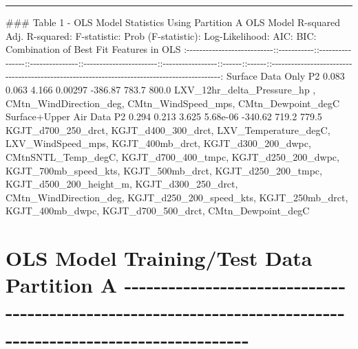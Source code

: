 \documentclass[11pt]{article}
\begin{document}
\begin{center}\rule{0.5\linewidth}{\linethickness}\end{center}

\#\#\# Table 1 - OLS Model Statistics Using Partition A \textbar{}OLS
Model \textbar{} R-squared \textbar{} Adj. R-squared: \textbar{}
F-statistic: \textbar{} Prob (F-statistic): \textbar{} Log-Likelihood:
\textbar{} AIC: \textbar{} BIC: \textbar{} Combination of Best Fit
Features in OLS \textbar{}
\textbar{}:-\/-\/-\/-\/-\/-\/-\/-\/-\/-\/-\/-\/-\/-\/-\/-\/-\/-\/-\/-\/-\/-\/-\/-\/-\/-\/-:\textbar{}:-\/-\/-\/-\/-\/-\/-\/-\/-\/-\/-:\textbar{}:-\/-\/-\/-\/-\/-\/-\/-\/-\/-\/-\/-\/-\/-\/-\/-:\textbar{}:-\/-\/-\/-\/-\/-\/-\/-\/-\/-\/-\/-\/-\/-\/-:\textbar{}:-\/-\/-\/-\/-\/-\/-\/-\/-\/-\/-\/-\/-\/-\/-\/-\/-\/-\/-\/-\/-\/-\/-:\textbar{}:-\/-\/-\/-\/-\/-\/-\/-\/-\/-\/-\/-\/-\/-\/-\/-\/-:\textbar{}:-\/-\/-\/-\/-\/-:\textbar{}:-\/-\/-\/-\/-\/-:\textbar{}:-\/-\/-\/-\/-\/-\/-\/-\/-\/-\/-\/-\/-\/-\/-\/-\/-\/-\/-\/-\/-\/-\/-\/-\/-\/-\/-\/-\/-\/-\/-\/-\/-\/-\/-\/-\/-\/-\/-\/-\/-\/-\/-\/-\/-\/-\/-\/-\/-\/-\/-\/-\/-\/-\/-\/-\/-\/-\/-\/-\/-\/-\/-\/-\/-\/-\/-\/-\/-\/-\/-\/-\/-\/-\/-\/-\/-\/-\/-\/-\/-\/-\/-\/-\/-\/-\/-\/-\/-\/-\/-\/-:\textbar{}
\textbar{}Surface Data Only P2 \textbar{} 0.083 \textbar{} 0.063
\textbar{} 4.166 \textbar{}0.00297 \textbar{} -386.87 \textbar{} 783.7
\textbar{} 800.0 \textbar{} LXV\_12hr\_delta\_Pressure\_hp ,
CMtn\_WindDirection\_deg, CMtn\_WindSpeed\_mps, CMtn\_Dewpoint\_degC
\textbar{} \textbar{} Surface+Upper Air Data P2 \textbar{} 0.294
\textbar{} 0.213 \textbar{} 3.625 \textbar{}5.68e-06 \textbar{} -340.62
\textbar{} 719.2 \textbar{} 779.5 \textbar{} KGJT\_d700\_250\_drct,
KGJT\_d400\_300\_drct, LXV\_Temperature\_degC, LXV\_WindSpeed\_mps,
KGJT\_400mb\_drct, KGJT\_d300\_200\_dwpc, CMtnSNTL\_Temp\_degC,
KGJT\_d700\_400\_tmpc, KGJT\_d250\_200\_dwpc, KGJT\_700mb\_speed\_kts,
KGJT\_500mb\_drct, KGJT\_d250\_200\_tmpc, KGJT\_d500\_200\_height\_m,
KGJT\_d300\_250\_drct, CMtn\_WindDirection\_deg,
KGJT\_d250\_200\_speed\_kts, KGJT\_250mb\_drct, KGJT\_400mb\_dwpc,
KGJT\_d700\_500\_drct, CMtn\_Dewpoint\_degC \textbar{}

\section{OLS Model Training/Test Data Partition A
-\/-\/-\/-\/-\/-\/-\/-\/-\/-\/-\/-\/-\/-\/-\/-\/-\/-\/-\/-\/-\/-\/-\/-\/-\/-\/-\/-\/-\/-\/-\/-\/-\/-\/-\/-\/-\/-\/-\/-\/-\/-\/-\/-\/-\/-\/-\/-\/-\/-\/-\/-\/-\/-\/-\/-\/-\/-\/-\/-\/-\/-\/-\/-\/-\/-\/-\/-\/-\/-\/-\/-\/-\/-\/-\/-\/-\/-\/-\/-\/-\/-\/-\/-\/-\/-\/-\/-\/-\/-\/-\/-\/-\/-\/-\/-\/-\/-\/-\/-\/-\/-\/-\/-\/-\/-\/-\/-\/-}\label{ols-model-trainingtest-data-partition-a--------------------------------------------------------------------------------------------------------------}
\end{document}
